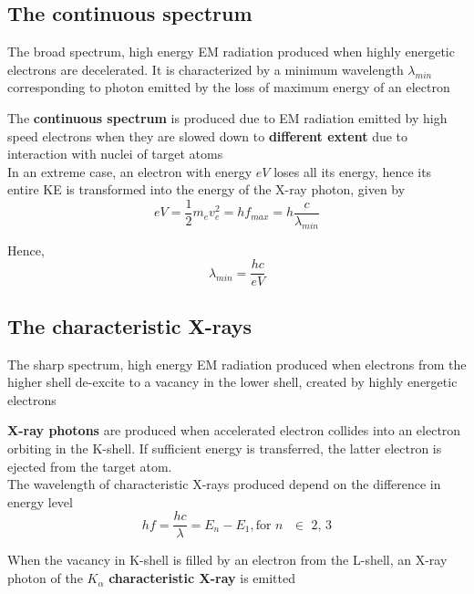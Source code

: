 \documentclass[a4paper, 10pt]{article}
\begin{document}
\subsection{The continuous spectrum}

\begin{framed}
   The broad spectrum, high energy EM radiation produced when highly energetic electrons are decelerated. It is characterized by a minimum wavelength $\lambda_{min}$ corresponding to photon emitted by the loss of maximum energy of an electron
\end{framed}	
   The \textbf{continuous spectrum} is produced due to EM radiation emitted by high speed electrons when they are slowed down to \textbf{different extent} due to interaction with nuclei of target atoms \\

In an extreme case, an electron with energy $eV$ loses all its energy, hence its entire KE is transformed into the energy of the X-ray photon, given by
\[
   eV = \frac{1}{2}m_e v_e^2 = hf_{max} = h \frac{c}{\lambda_{min}}
\]

Hence,
\[
   \lambda_{min} = \frac{hc}{eV}
\]


\subsection{The characteristic X-rays}

\begin{framed}
   The sharp spectrum, high energy EM radiation produced when electrons from the higher shell de-excite to a vacancy in the lower shell, created by highly energetic electrons
\end{framed}	
   \textbf{X-ray photons} are produced when accelerated electron collides into an electron orbiting in the K-shell. If sufficient energy is transferred, the latter electron is ejected from the target atom. \\

  The wavelength of characteristic X-rays produced depend on the difference in energy level
  \[
     hf = \frac{hc}{\lambda} = E_n - E_1, \text{for $n$ $\in$ 2, 3}
  \]
  

   When the vacancy in K-shell is filled by an electron from the L-shell, an X-ray photon of the $K_{\alpha}$ \textbf{characteristic X-ray} is emitted \\
\end{document}
